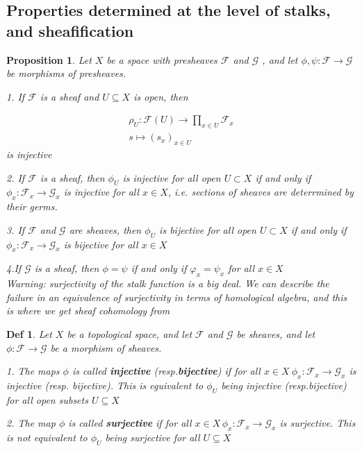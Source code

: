 \documentclass{article}
\newtheorem{definition}[theorem]{Def}
\newtheorem{proposition}[theorem]{Proposition}
\begin{document}
\newpage
\subsection{Properties determined at the level of stalks, and sheafification}

\begin{proposition}
Let $X$ be a space with presheaves $\textstyle{\mathcal{F}}$ and $\mathcal{G}$ , and let $\phi,\psi:{\mathcal{F}} \rightarrow{\mathcal{G}}$ be morphisms of 
presheaves.

1. If $\textstyle{\mathcal{F}}$ is a sheaf and $U\subseteq X$ is open, then

$$
\begin{array}{c}{{\rho_{U}:{\mathcal{F}}(U)\longrightarrow\prod_{x\in{U}}{\mathcal{F}}_{x}}}\\ {{s\longmapsto(s_{x})_{x\in{U}}}}\end{array} 
$$
is injective

2. If $\textstyle{\mathcal{F}}$ is a sheaf, then $\phi_{U}$ is injective for all open $U\subset X$ if and only if $\phi_{x}:{\mathcal{F}}_{x}\to{\mathcal{G}}_{x}$ is injective for all $x\in X$, i.e. sections of sheaves are deterrmined by their germs.

3. If $\mathbf{\mathcal{F}}$ and $\mathcal G$ are sheaves, then $\phi_{U}$ is bijective for all open $U\subset X$ if and only if $\phi_{x}:{\mathcal{F}}_{x}\to{\mathcal{G}}_{x}$ is bijective for all $x\in X$ 

4.If $\mathcal G$ is a sheaf, then $\phi=\psi$ if and only if $\varphi_{x}=\psi_{x}$ for all $x\in X$ 
\\

Warning: surjectivity of the stalk function is a big deal. We can
describe the failure in an equivalence of surjectivity in terms of homological algebra, and this is where
we get sheaf cohomology from
\end{proposition}
\begin{definition}
    Let $X$ be a topological space, and let $\mathcal{F}$ and $\mathcal{G}$ be sheaves, and let $\phi:{\mathcal{F}} \rightarrow{\mathcal{G}}$ be a morphism of sheaves.
    
1. The maps $\phi$ is called \textbf{injective} (resp.\textbf{bijective}) if for all $x\in X\ \phi_{x}:{\mathcal{F}}_{x} \rightarrow{\mathcal{G}}_{x}$ is injective (resp.
bijective). This is eguivalent to $\phi_{U}$ being injective (resp.bijective) for all open subsets $U\subseteq X$ 

2. The map $\phi$ is called \textbf{surjective} if for all $x\in X\,\phi_{x}:{\mathcal{F}}_{x} \rightarrow{\mathcal{G}}_{x}$ is surjective. This is not equivalent to $\phi_U$ being surjective for all $U\subseteq X$
\end{definition}
\end{document}
